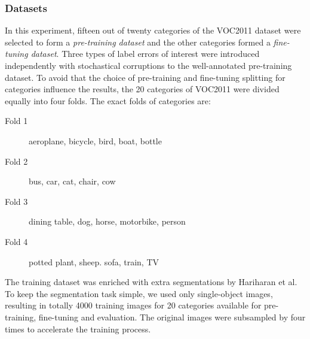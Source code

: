 \subsubsection{Datasets}
\label{subsubsec:noises}

In this experiment, fifteen out of twenty categories of the VOC2011 dataset were selected to form a \textit{pre-training dataset} and the other categories formed a \textit{fine-tuning dataset}.
Three types of label errors of interest were introduced independently with stochastical corruptions to the well-annotated pre-training dataset.
To avoid that the choice of pre-training and fine-tuning splitting for categories influence the results, the 20 categories of VOC2011 were divided equally into four folds.
The exact folds of categories are:
\begin{description}
  \item [Fold 1] aeroplane, bicycle, bird, boat, bottle
  \item [Fold 2] bus, car, cat, chair, cow
  \item [Fold 3] dining table, dog, horse, motorbike, person
  \item [Fold 4] potted plant, sheep. sofa, train, TV
\end{description}
The training dataset was enriched with extra segmentations by Hariharan et al. \cite{hariharan2011semantic}
To keep the segmentation task simple, we used only single-object images, resulting in totally 4000 training images for 20 categories available for pre-training, fine-tuning and evaluation.
The original images were subsampled by four times to accelerate the training process.



